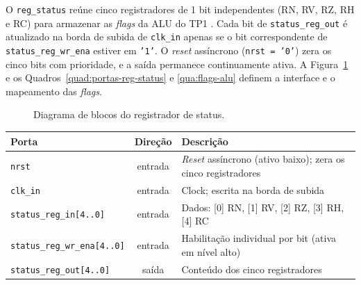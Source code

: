 \documentclass[
	12pt,				%
	oneside,			%
	a4paper,			%
	sumario = tradicional,
	english,			%
	brazilian			%
	]{abntex2}
\newcommand{\fio}{2.2} %
\newcommand{\pentrada}[3]{\draw[->,#3] ($(bloco.west)+(-\fio,#1)$) -- ($(bloco.west)+(0,#1)$);
  \node[port, anchor=east] at ($(bloco.west)+(-\fio-0.1,#1)$) {#2};}
\newcommand{\psaida}[3]{\draw[->,#3] ($(bloco.east)+(0,#1)$) -- ($(bloco.east)+(\fio,#1)$);
  \node[port, anchor=west] at ($(bloco.east)+(\fio+0.1,#1)$) {#2};}
\begin{document}
O \texttt{reg\_status} reúne cinco registradores de 1 bit independentes (RN, RV, RZ, RH e RC) para armazenar as \textit{flags} da ALU do TP1 \cite{tp2}. Cada bit de \texttt{status\_reg\_out} é atualizado na borda de subida de \texttt{clk\_in} apenas se o bit correspondente de \texttt{status\_reg\_wr\_ena} estiver em \texttt{'1'}. O \textit{reset} assíncrono (\texttt{nrst = '0'}) zera os cinco bits com prioridade, e a saída permanece continuamente ativa. A Figura~\ref{fig:bloco-reg-status} e os Quadros~\ref{quad:portas-reg-status} e \ref{qua:flags-alu} definem a interface e o mapeamento das \textit{flags}.

\begin{figure}[!htb]
\caption{Diagrama de blocos do registrador de status.}\label{fig:bloco-reg-status}
\centering
{}
\end{figure}

\begin{quadro}[!htb]
  \SingleSpacing
  \caption{Portas do registrador de status.}
  \label{quad:portas-reg-status}
  \centering
  \begin{tabular}{lcp{7.4cm}}
    \hline
    Porta & Direção & Descrição \\ \hline
    \texttt{nrst} & entrada & \textit{Reset} assíncrono (ativo baixo); zera os cinco registradores \\
    \texttt{clk\_in} & entrada & Clock; escrita na borda de subida \\
    \texttt{status\_reg\_in[4..0]} & entrada & Dados: [0] RN, [1] RV, [2] RZ, [3] RH, [4] RC \\
    \texttt{status\_reg\_wr\_ena[4..0]} & entrada & Habilitação individual por bit (ativa em nível alto) \\
    \texttt{status\_reg\_out[4..0]} & saída & Conteúdo dos cinco registradores \\ \hline
  \end{tabular}
\end{quadro}
\end{document}
